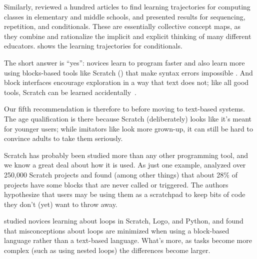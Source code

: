 Similarly,
\cite{Rich2017} reviewed a hundred articles to find learning trajectories for computing classes in elementary and middle schools,
and presented results for sequencing, repetition, and conditionals.
These are essentially collective concept maps,
as they combine and rationalize the implicit and explicit thinking of many different educators.
 shows the learning trajectories for conditionals.



The short answer is ``yes'': novices learn to program faster and also learn more using blocks-based tools like Scratch () that make syntax errors impossible \cite{Wein2017b}. And block interfaces encourage exploration in a way that text does not; like all good tools, Scratch can be learned accidentally~\cite{Malo2010}.

Our fifth recommendation is therefore to  before moving to text-based systems. The age qualification is there because Scratch (deliberately) looks like it's meant for younger users; while imitators like  look more grown-up, it can still be hard to convince adults to take them seriously.


Scratch has probably been studied more than any other programming tool, and we know a great deal about how it is used. As just one example, \cite{Aiva2016} analyzed over 250,000 Scratch projects and found (among other things) that about 28\% of projects have some blocks that are never called or triggered. The authors hypothesize that users may be using them as a scratchpad to keep bits of code they don't (yet) want to throw away.

\cite{Grov2017,Mlad2017} studied novices learning about loops in Scratch, Logo, and Python, and found that misconceptions about loops are minimized when using a block-based language rather than a text-based language. What's more, as tasks become more complex (such as using
nested loops) the differences become larger.

